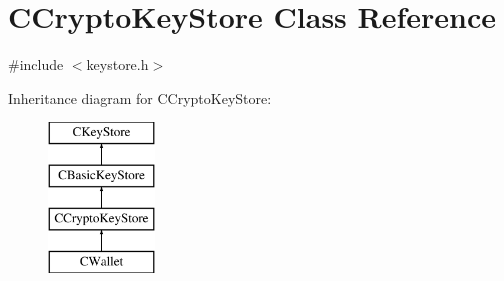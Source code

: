 \hypertarget{class_c_crypto_key_store}{}\section{C\+Crypto\+Key\+Store Class Reference}
\label{class_c_crypto_key_store}


{\ttfamily \#include $<$keystore.\+h$>$}

Inheritance diagram for C\+Crypto\+Key\+Store\+:\begin{figure}[H]
\begin{center}
\leavevmode
\includegraphics[height=4.000000cm]{class_c_crypto_key_store}
\end{center}
\end{figure}
